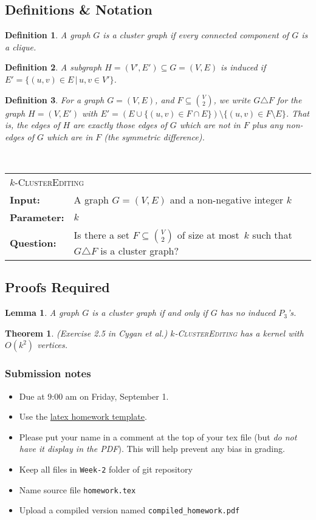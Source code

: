 \documentclass{article}
\newcommand{\defproblem}[4]{%
  \hfill\\\smallskip\noindent%
  \begin{tabularx}{\textwidth}{|l X|}%
    \hline%
    \multicolumn{2}{|l|}{\pname{#1}}\\%
    \textbf{Input:}&#2\\%
    \textbf{Parameter:}&#3\\%
    \textbf{Question:}&#4\smallskip\\\hline%
  \end{tabularx}%
  \smallskip%
}%
\newcommand{\pname}[1]{\textnormal{\textsc{#1}}}
\newtheorem*{theorem}{Theorem}
\newtheorem{definition}{Definition}
\newtheorem*{lemma}{Lemma}
\begin{document}
\subsection*{Definitions \& Notation}
\begin{definition}
A graph $G$ is a \emph{cluster graph} if every connected component of $G$ is a clique.
\end{definition}

\begin{definition}
A subgraph $H = (V',E') \subseteq G = (V,E)$ is \emph{induced} if
$E' = \{(u,v) \in E \,|\, u,v \in V'\}$.
\end{definition}

\begin{definition}
For a graph $G = (V,E)$, and $F \subseteq \binom{V}{2}$, we write $G \triangle F$
for the graph $H = (V,E')$ with
$E' = \left(E \cup \{(u,v) \in F \cap E \}\right) \setminus \{(u,v) \in F \setminus E\}$.
That is, the edges of $H$ are exactly those edges of $G$ which are not in $F$ plus any
non-edges of $G$ which are in $F$ (the symmetric difference).
\end{definition}


\defproblem{$k$-ClusterEditing}
%
{A graph $G = (V,E)$ and a non-negative integer $k$}
%
{$k$}
%
{Is there a set $F \subseteq \binom{V}{2}$ of size at most~$k$ such that $G \triangle F$
  is a cluster graph?}
%


\subsection*{Proofs Required}
\begin{lemma}
A graph $G$ is a cluster graph if and only if $G$ has no induced $P_3$'s.
\end{lemma}

\begin{theorem} ({\small Exercise 2.5 in Cygan et al.}) $k$-\pname{ClusterEditing} has a kernel with $O(k^2)$
  vertices.
\end{theorem}


\vfill

\subsubsection*{Submission notes}
\begin{itemize}
\item Due at 9:00 am on Friday, September 1.
\item Use the \href{https://github.com/bdsullivan/ParameterizedAlgorithms-Fall2017/tree/master/templates/homework}{latex homework template}.
\item Please put your name in a comment at the top of your tex file (but {\it do not
have it display in the PDF}). This will help prevent any bias in grading.
\item Keep all files in \texttt{Week-2} folder of git repository
\item Name source file \texttt{homework.tex}
\item Upload a compiled version named \texttt{compiled\_homework.pdf}
\end{itemize}
\end{document}
